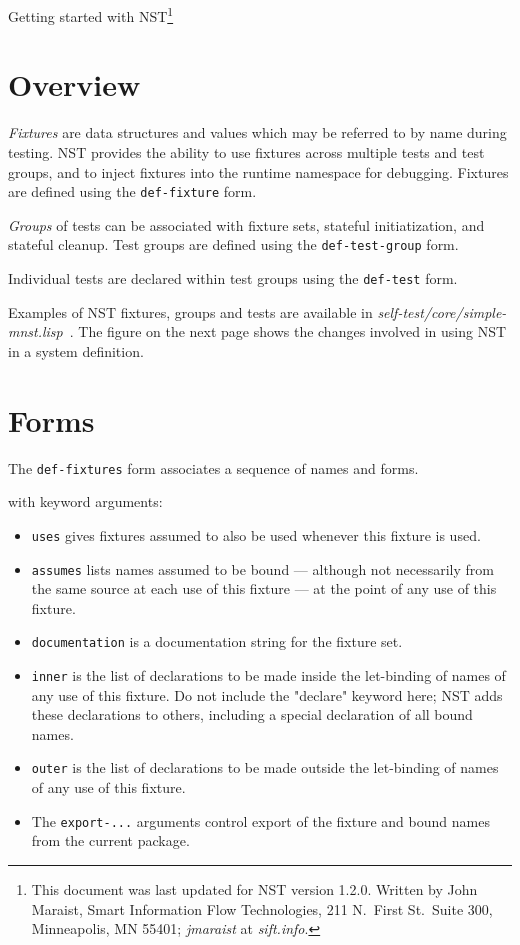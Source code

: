 \documentclass{article}
\begin{document}
\thispagestyle{empty}
\begin{center}
  \LARGE Getting started with NST\footnote{This document was last
    updated for NST version 1.2.0.  Written by John Maraist, Smart
    Information Flow Technologies, 211 N.\ First St.\ Suite 300,
    Minneapolis, MN 55401; \textsl{jmaraist} at \textsl{sift.info}.}
\end{center}

\section*{Overview}
\emph{Fixtures} are data structures and values which may be referred
to by name during testing.  NST provides the ability to use fixtures
across multiple tests and test groups, and to inject fixtures into the
runtime namespace for debugging.  Fixtures are defined using the
\texttt{def-fixture} form.

\emph{Groups} of tests can be associated with fixture sets, stateful
initiatization, and stateful cleanup.  Test groups are defined using
the \texttt{def-test-group} form.

Individual tests are declared within test groups using the
\texttt{def-test} form.

Examples of NST fixtures, groups and tests are available in
\textsl{self-test/core/simple-mnst.lisp}~.  The figure on the next
page shows the changes involved in using NST in a system definition.

\section*{Forms}
The \texttt{def-fixtures} form associates a sequence of names and
forms.

with keyword arguments:
\begin{itemize}

\item\texttt{uses} gives fixtures assumed to also be used whenever
  this fixture is used.

\item\texttt{assumes} lists names assumed to be bound --- although not
  necessarily from the same source at each use of this fixture --- at
  the point of any use of this fixture.

\item\texttt{documentation} is a documentation string for the fixture
  set.

\item\texttt{inner} is the list of declarations to be made inside the
  let-binding of names of any use of this fixture.  Do not include the
  "declare" keyword here; NST adds these declarations to others,
  including a special declaration of all bound names.

\item\texttt{outer} is the list of declarations to be made outside the
  let-binding of names of any use of this fixture.

\item The \texttt{export-...} arguments control export of the fixture
  and bound names from the current package.
\end{itemize}
\end{document}
